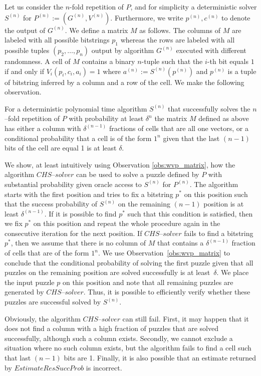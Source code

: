 Let us consider the $n$-fold repetition of $P$, and for simplicity a deterministic solver $S^{(n)}$ for $P^{(n)} := (G^{(n)}, V^{(n)})$.
Furthermore, we write $p^{(n)}, c^{(n)}$ to denote the output of $G^{(n)}$.
We define a matrix $M$ as follows. The columns of $M$ are labeled with all possible bitstrings $p_1$
whereas the rows are labeled with all possible tuples $(p_2, \dotsc, p_n)$ output by algorithm $G^{(n)}$
executed with different randomness.
A cell of $M$ contains a binary $n$-tuple such that the $i$-th bit equals $1$ if and only if $V_i(p_i, c_i, a_i) = 1$ where
 $a^{(n)} := S^{(n)}(p^{(n)})$ and $p^{(n)}$ is a tuple of bitstring inferred by a column and a row of the cell.
We make the following observation.
%
\begin{observation}
\label{obs:wvp_matrix}
For a deterministic polynomial time algorithm $S^{(n)}$ that successfully solves the $n$--fold repetition of $P$ with probability at least $\delta^{n}$
the matrix $M$ defined as above has either a column with $\delta^{(n-1)}$ fractions of cells that are all one vectors, or
a conditional probability that a cell is of the form $1^n$ given that the last $(n-1)$ bits of the cell are equal 1 is at least $\delta$.
\end{observation}
%
We show, at least intuitively using Observation \ref{obs:wvp_matrix}, how the algorithm $\mathit{CHS\text{--}solver}$ can be used to solve a puzzle defined by $P$
with substantial probability given oracle access to $S^{(n)}$ for $P^{(n)}$.
The algorithm starts with the first position and tries to fix a bitstring $p^*$ on this position such that the success probability of $S^{(n)}$ on the remaining $(n-1)$
position is at least $\delta^{(n-1)}$. If it is possible to find $p^*$ such that this condition is satisfied, then we fix $p^*$
on this position and repeat the whole procedure again in the consecutive iteration for the next position.
If $\mathit{CHS\text{--}solver}$ fails to find a bitstring $p^*$, then we assume that there is no column of $M$ that contains a $\delta^{(n-1)}$ fraction
of cells that are of the form $1^n$. We use Observation~\ref{obs:wvp_matrix} to conclude that the conditional probability of
solving the first puzzle given that all puzzles on the remaining position are solved successfully is at least~$\delta$.
We place the input puzzle $p$ on this position and note that all remaining puzzles are generated by $\mathit{CHS\text{--}solver}$.
Thus, it is possible to efficiently verify whether these puzzles are successful solved by $S^{(n)}$.

Obviously, the algorithm $\mathit{CHS\text{--}solver}$ can still fail. First, it may happen that it does not find a column
with a high fraction of puzzles that are solved successfully, although such a column exists.
Secondly, we cannot exclude a situation where no such column exists, but the algorithm fails to find a cell such that last $(n\!-\!1)$ bits are 1.
Finally, it is also possible that an estimate returned by $\mathit{EstimateResSuccProb}$ is incorrect.

